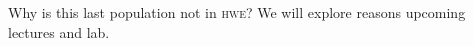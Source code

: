 \documentclass[t]{beamer}
\begin{document}
\begin{frame}{Why is this last population not in \textsc{hwe}?}
%
	\hangpara We will explore reasons upcoming lectures and lab.
	
%	
%	
\end{frame}
\end{document}
